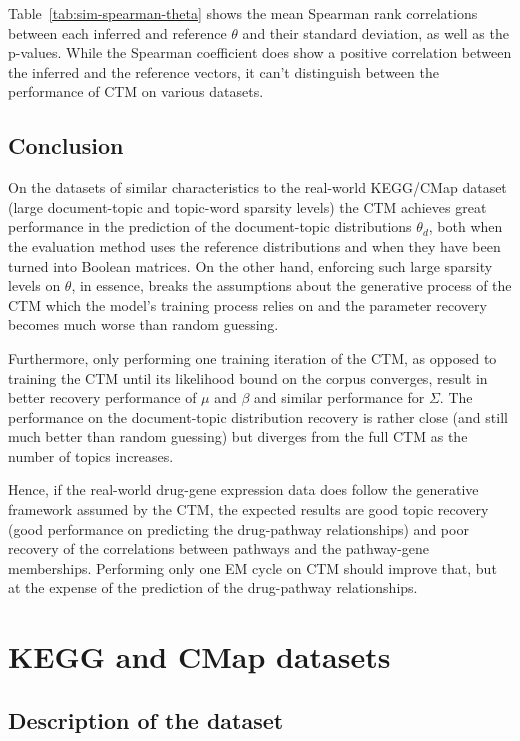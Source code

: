 \documentclass[12pt,a4paper,twoside,openright]{report}
\begin{document}
Table~\ref{tab:sim-spearman-theta} shows the mean Spearman rank correlations between each inferred and reference $\theta$ and their standard deviation, as well as the p-values. While the Spearman coefficient does show a positive correlation between the inferred and the reference vectors, it can't distinguish between the performance of CTM on various datasets.

\subsection{Conclusion}

On the datasets of similar characteristics to the real-world KEGG/CMap dataset (large document-topic and topic-word sparsity levels) the CTM achieves great performance in the prediction of the document-topic distributions $\theta_d$, both when the evaluation method uses the reference distributions and when they have been turned into Boolean matrices. On the other hand, enforcing such large sparsity levels on $\theta$, in essence, breaks the assumptions about the generative process of the CTM which the model's training process relies on and the parameter recovery becomes much worse than random guessing.

Furthermore, only performing one training iteration of the CTM, as opposed to training the CTM until its likelihood bound on the corpus converges, result in better recovery performance of $\mu$ and $\beta$ and similar performance for $\Sigma$. The performance on the document-topic distribution recovery is rather close (and still much better than random guessing) but diverges from the full CTM as the number of topics increases.

Hence, if the real-world drug-gene expression data does follow the generative framework assumed by the CTM, the expected results are good topic recovery (good performance on predicting the drug-pathway relationships) and poor recovery of the correlations between pathways and the pathway-gene memberships. Performing only one EM cycle on CTM should improve that, but at the expense of the prediction of the drug-pathway relationships.

\section{KEGG and CMap datasets}

\subsection{Description of the dataset}
\end{document}
